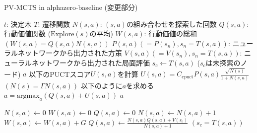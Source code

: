 \begin{algorithm}
    \caption{PV-MCTS in alphazero-baseline (変更部分)}
    \begin{algorithmic}[1]
    \small
        \State $t$: 決定木
        \State $T$: 遷移関数
        \State $N(s, a)$: $(s, a)$の組み合わせを探索した回数
        \State $Q(s, a)$: 行動価値関数 ($\textrm{Explore}(s)$の平均)
        \State $W(s, a)$: 行動価値の総和$(W(s, a)=Q(s, a)N(s, a))$
        \State $P(s, a)(=P(s_n), s_n=T(s, a))$: 
        \State ニューラルネットワークから出力された方策
        \State $V(s, a)(=V(s_n), s_n=T(s, a))$: 
        \State ニューラルネットワークから出力された局面評価
                \State $s_c \gets T(s, a)$ ($s_c$は未探索のノード)
                \State {}
                \State \Return $a$
            \Else
                \State 以下のPUCTスコア$U(s, a)$を計算
                \State \underline{$U(s, a)= C_{\textrm{cpuct}}P(s, a)\frac{\sqrt{N(s)}}{1+N(s, a)}$}
                \State $(N(s)=\Gamma N(s, a))$
                \State 以下のように$a$を求める
                \State $a = {\textrm{argmax}}_a (Q(s, a)+U(s, a))$
                \State \Return $a$
                
            \EndIf
        \EndFunction
                \State $N(s, a) \gets 0$
                \State $W(s, a) \gets 0$
                \State $Q(s, a) \gets 0$
            \EndFor
        \EndFunction
                \State $N(s, a) \gets N(s, a)+1$
                \State $W(s, a) \gets W(s, a)+G$
                \State \underline{$Q(s, a) \gets \frac{N(s, a)Q(s, a)+V(s_c)}{N(s, a)+1}$}
				\State $(s_c = T(s, a))$
            \EndFor
        \EndFunction
    \end{algorithmic}
\end{algorithm}